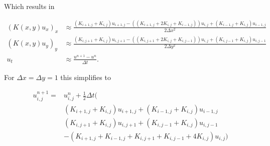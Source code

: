 \documentclass[11pt,a4paper,noindent]{article}
\begin{document}
Which results in 

\begin{align}
(K(x,y) u_x)_x &\approx \frac{ (K_{i+1,j}+K_{i,j}) u_{i+1,j} - 
			    ( (K_{i+1,j}+2K_{i,j}+K_{i-1,j}))u_{i,j} + 								 (K_{i-1,j}+K_{i,j}) u_{i-1,j} }{2\Delta x^2} \\
(K(x,y) u_y)_y &\approx \frac{ (K_{i,j+1}+K_{i,j}) u_{i,j+1} - 
			    ( (K_{i,j+1}+2K_{i,j}+K_{i,j-1}))u_{i,j} + 								 (K_{i,j-1}+K_{i,j}) u_{i,j-1} }{2\Delta y^2} \\
u_t &\approx \frac{u^{n+1} - u^n}{\Delta t}.
\end{align}

For $\Delta x = \Delta y = 1$ this simplifies to

\begin{align}
u^{n+1}_{i,j} = &u^{n}_{i,j} + \frac{1}{2}\Delta t (\\
& (K_{i+1,j}+K_{i,j}) u_{i+1,j}  + (K_{i-1,j}+K_{i,j}) u_{i-1,j} \\
& (K_{i,j+1}+K_{i,j}) u_{i,j+1}  + (K_{i,j-1}+K_{i,j}) u_{i,j-1} \\
& - (K_{i+1,j}+K_{i-1,j}+K_{i,j+1}+K_{i,j-1}+4K_{i,j} )u_{i,j})
\end{align}
\end{document}

